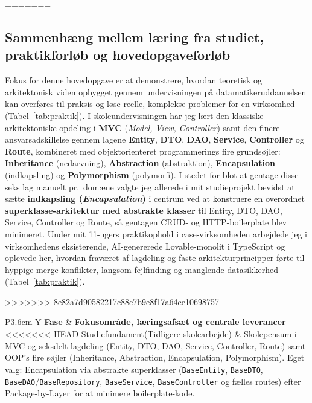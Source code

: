 \documentclass[11pt,a4paper]{article}
\begin{document}
\begin{table}[htbp]
=======
\subsection{Sammenhæng mellem læring fra studiet, praktikforløb og hovedopgaveforløb}
Fokus for denne hovedopgave er at demonstrere, hvordan teoretisk og arkitektonisk viden opbygget gennem undervisningen på datamatikeruddannelsen kan overføres til praksis og løse reelle, komplekse problemer for en virksomhed (Tabel~\ref{tab:praktik}). I skoleundervisningen har jeg lært den klassiske arkitektoniske opdeling i \textbf{MVC} (\textit{Model, View, Controller}) samt den finere ansvarsadskillelse gennem lagene \textbf{Entity}, \textbf{DTO}, \textbf{DAO}, \textbf{Service}, \textbf{Controller} og \textbf{Route}, kombineret med objektorienteret programmerings fire grundsøjler: \textbf{Inheritance} (nedarvning), \textbf{Abstraction} (abstraktion), \textbf{Encapsulation} (indkapsling) og \textbf{Polymorphism} (polymorfi). I stedet for blot at gentage disse seks lag manuelt pr.\ domæne valgte jeg allerede i mit studieprojekt bevidst at sætte \textbf{indkapsling (\textit{Encapsulation})} i centrum ved at konstruere en overordnet \textbf{superklasse-arkitektur med abstrakte klasser} til Entity, DTO, DAO, Service, Controller og Route, så gentagen CRUD- og HTTP-boilerplate blev minimeret.
\newline
Under mit 11-ugers praktikophold i case-virksomheden arbejdede jeg i virksomhedens eksisterende, AI-genererede Lovable-monolit i TypeScript og oplevede her, hvordan fraværet af lagdeling og faste arkitekturprincipper førte til hyppige merge-konflikter, langsom fejlfinding og manglende datasikkerhed (Tabel~\ref{tab:praktik}).
\newline
\begin{table}[H]
>>>>>>> 8e82a7d90582217c88c7b9e8f17a64ee10698757
\centering
\small
\begin{tabularx}{\textwidth}{P{3.6cm} Y}
\toprule
\textbf{Fase} & \textbf{Fokusområde, læringsafsæt og centrale leverancer} \\
\midrule
<<<<<<< HEAD
Studiefundament\newline (Tidligere skolearbejde) & Skolepensum i MVC og seksdelt lagdeling (Entity, DTO, DAO, Service, Controller, Route) samt OOP's fire søjler (Inheritance, Abstraction, Encapsulation, Polymorphism). Eget valg: Encapsulation via abstrakte superklasser (\texttt{BaseEntity}, \texttt{BaseDTO}, \texttt{BaseDAO}/\texttt{BaseRepository}, \texttt{BaseService}, \texttt{BaseController} og fælles routes) efter Package-by-Layer for at minimere boilerplate-kode. \\

\end{tabularx}
\end{table}
\end{table}
\end{document}
